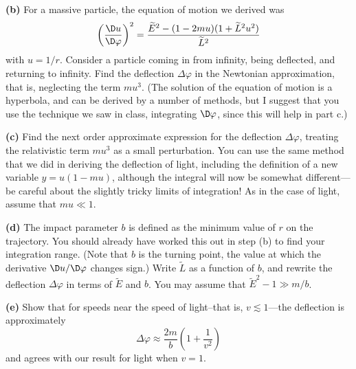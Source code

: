 \begin{exercises}
\begin{xca}
\textbf{(b)}
For a massive particle, the equation of motion we derived was
\begin{equation}
\left(\frac{\D u}{\D\varphi}\right)^{2}=
\frac{\widetilde{E}^{2}-(1-2mu)(1+\widetilde{L}^{2}u^{2})}{\widetilde{L}^{2}}
\end{equation}
with $u = 1/r$. Consider a particle coming in from infinity,
being deflected, and returning to infinity. Find the deflection
$\Delta\varphi$ in the Newtonian approximation, that is,
neglecting the  term $mu^{3}$. (The solution of the equation of motion is a hyperbola, and can be derived by  a number of methods, but I suggest that you use the technique we saw in class, integrating $\D\varphi$, since this will help in part c.)

\textbf{(c)}
Find the next order approximate expression for the deflection
$\Delta\varphi$, treating the relativistic term $mu^{3}$ as a
small perturbation. You can use the same method that we did in
deriving the deflection of light, including the
definition of a new variable $y = u(1 - mu)$, although the
integral will now be somewhat different---be careful about the
slightly tricky limits of integration! As in the case of light,
assume that $mu\ll1$. 

\textbf{(d)}
The impact parameter $b$ is defined as the minimum value of $r$
on the trajectory. You should already have worked this out in
step (b) to find your integration range. (Note that $b$ is the
turning point, the value at which the derivative $\D u/\D\varphi$
changes sign.) Write $\widetilde{L}$ as a function of $b$, and
rewrite the deflection $\Delta\varphi$ in terms of
$\widetilde{E}$ and $b$. You may assume that
$\widetilde{E}^{2}-1\gg m/b$.

\textbf{(e)}
Show that for speeds near the speed of light--that is,
$v\lesssim1$---the deflection is approximately 
\begin{equation}
\Delta\varphi\approx\frac{2m}{b}\left(1+\frac{1}{v^{2}}\right)
\end{equation}
and agrees with our result for light when $v = 1$.
\end{xca}
\end{exercises}
